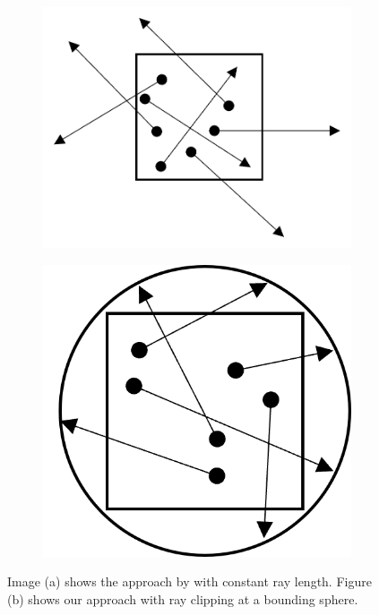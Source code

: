 \begin{figure}[ht]
    \centering
    \begin{subfigure}[b]{0.25\linewidth}
        \centering
        \includegraphics[width=\linewidth]{img/raygen_filtering_unclipped.png}
        \caption{}
        \label{fig:raygen_filtering_unclipped}
    \end{subfigure}
    \begin{subfigure}[b]{0.25\linewidth}
        \centering
        \includegraphics[width=1\linewidth]{img/raygen_filtering_clipped.png}
        \caption{}
        \label{fig:raygen_filtering_clipped}
    \end{subfigure}
	\caption{Image (a) shows the approach by \citeauthor{hybrid_mesh_volume_lods} with constant ray length. Figure (b) shows our approach with ray clipping at a bounding sphere.}
	\label{fig:raygen_filtering}
\end{figure}

